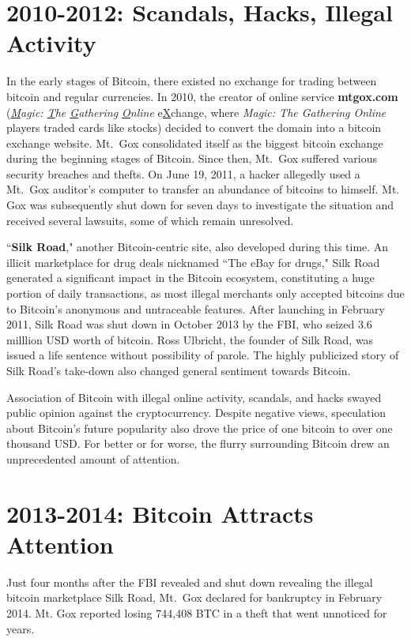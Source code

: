 \documentclass[11pt]{article}
\begin{document}
    \section*{2010-2012: Scandals, Hacks, Illegal Activity}
    In the early stages of Bitcoin, there existed no exchange for trading between bitcoin and regular currencies. In 2010, the creator of online service \textbf{mtgox.com} (\textit{\underline{M}agic: \underline{T}he 
    \underline{G}athering \underline{O}nline} e\underline{X}change, where \emph{Magic: The Gathering Online} players traded cards like stocks) decided to convert the domain into a bitcoin exchange website. Mt.\ Gox consolidated itself as the biggest bitcoin exchange during the beginning stages of Bitcoin. Since then, Mt.\ Gox suffered various security breaches and thefts. On June 19, 2011, a hacker allegedly used a Mt.\ Gox auditor's computer to transfer an abundance of bitcoins to himself. Mt. Gox was subsequently shut down for seven days to investigate the situation and received several lawsuits, some of which remain unresolved.
    
    ``\textbf{Silk Road}," another Bitcoin-centric site, also developed during this time. An illicit marketplace for drug deals nicknamed ``The eBay for drugs," Silk Road generated a significant impact in the Bitcoin ecosystem, constituting a huge portion of daily transactions, as most illegal merchants only accepted bitcoins due to Bitcoin's anonymous and untraceable features. After launching in February 2011, Silk Road was shut down in October 2013 by the FBI, who seized 3.6 milllion USD worth of bitcoin. Ross Ulbricht, the founder of Silk Road, was issued a life sentence without possibility of parole. The highly publicized story of Silk Road's take-down also changed general sentiment towards Bitcoin.
    
    Association of Bitcoin with illegal online activity, scandals, and hacks swayed public opinion against the cryptocurrency. Despite negative views, speculation about Bitcoin's future popularity also drove the price of one bitcoin to over one thousand USD. For better or for worse, the flurry surrounding Bitcoin drew an unprecedented amount of attention.
    \section*{2013-2014: Bitcoin Attracts Attention}
    
    Just four months after the FBI revealed and shut down revealing the illegal bitcoin marketplace Silk Road, Mt.\ Gox declared for bankruptcy in February 2014. Mt. Gox reported losing 744,408 BTC in a theft that went unnoticed for years.
    
\end{document}
